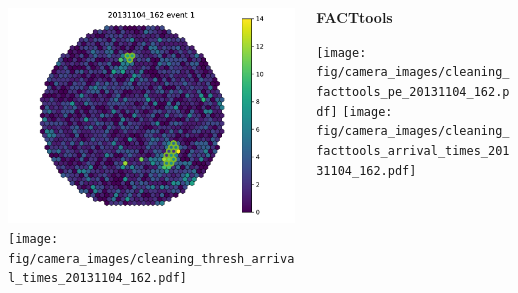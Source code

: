 \begin{withoutheadline}
\begin{frame}{}
\begin{columns}[onlytextwidth]
\begin{column}{0.33\textwidth}
        \includegraphics[width=\textwidth, page=67]{fig/camera_images/cleaning_thresh_pe_20131104_162.pdf}
        \texttt{[image: fig/camera\_images/cleaning\_thresh\_arrival\_times\_20131104\_162.pdf]}
      \end{column}
    \hfill%
      \begin{column}{0.33\textwidth}
        \centering
        \textbf{FACTtools}\par\medskip
        \texttt{[image: fig/camera\_images/cleaning\_facttools\_pe\_20131104\_162.pdf]}
        \texttt{[image: fig/camera\_images/cleaning\_facttools\_arrival\_times\_20131104\_162.pdf]}
      \end{column}
    \end{columns}
  \end{frame}
\end{withoutheadline}

